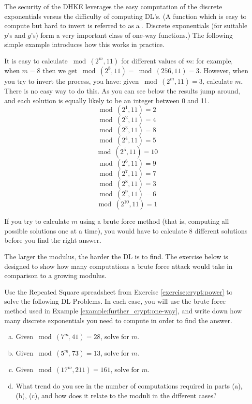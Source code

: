 The security of the DHKE leverages the easy computation of the discrete exponentials versus the difficulty of computing DL's. (A function which is easy to compute but hard to invert is referred to as a . Discrete exponentials (for suitable $p$'s and $g$'s) form a very important class of one-way functions.)
The following simple example introduces how this works in practice. 

\begin{example}\label{example:further_crypt:one-way}
It is easy to calculate $\bmod(2^{m},  11)$ for different values of $m$: for example, when $m =8$ then we get $\bmod(2^{8},  11) =\bmod(256,  11)  = 3$.  However, when you try to invert the process, you have: given $\bmod(2^{m},  11) = 3$, calculate $m$. There is no easy way to do this. As you can see below the results jump around, and each solution is equally likely to be an integer between 0 and 11. 
$$ \bmod(2^{1}, 11)=2$$
$$ \bmod(2^{2}, 11)=4$$
$$ \bmod(2^{3}, 11)=8$$
$$ \bmod(2^{4}, 11)=5$$
$$ \bmod(2^{5}, 11)=10$$
$$ \bmod(2^{6}, 11)=9$$
$$ \bmod(2^{7}, 11)=7$$
$$ \bmod(2^{8}, 11)=3$$
$$ \bmod(2^{9}, 11)=6$$
$$ \bmod(2^{10}, 11)=1$$
\end{example}
If you try to calculate $m$ using a brute force method (that is, computing all possible solutions one at a time), you would have to calculate 8 different solutions before you find the right answer. 

The larger the modulus, the harder the DL is to find. The exercise below is designed to show how many computations a brute force attack would take in comparison to a growing modulus.

\begin{exercise}\label{exercise:further_crypt:DLP}
Use the Repeated Square spreadsheet from Exercise \ref{exercise:crypt:power} to solve the following DL Problems. In each case, you will use the brute force method used in Example \ref{example:further_crypt:one-way}, and write down how many discrete exponentials you need to compute in order to find the answer.  
\begin{enumerate}[(a)]
\item Given $ \bmod(7^{m}, 41)=28$, solve for $m$.

\item Given $ \bmod(5^{m}, 73)=13$, solve for $m$.

\item Given $ \bmod(17^{m}, 211)=161$, solve for $m$.

\item
What trend do you see in the number of computations required in parts (a), (b), (c), and how does it relate to the moduli in the different cases?
\end{enumerate}
\end{exercise}

